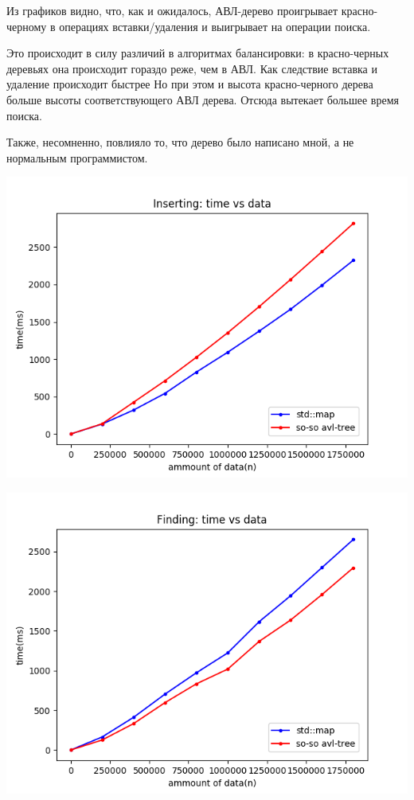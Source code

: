 \documentclass[12pt]{article}
\begin{document}
	Из графиков видно, что, как и ожидалось, АВЛ-дерево проигрывает красно-черному в операциях вставки/удаления и выигрывает на операции поиска.
	
	Это происходит в силу различий в алгоритмах балансировки: в красно-черных деревьях она происходит гораздо реже, чем в АВЛ. Как следствие вставка и удаление происходит быстрее Но при этом и высота красно-черного дерева больше высоты соответствующего АВЛ дерева. Отсюда вытекает большее время поиска.
	
	Также, несомненно, повлияло то, что дерево было написано мной, а не нормальным программистом.
	\begin{center}
		\includegraphics[width=\linewidth]{insert.png}
	\end{center}
	\begin{center}
		\includegraphics[width=\linewidth]{find.png}
	\end{center}
	
\end{document}
